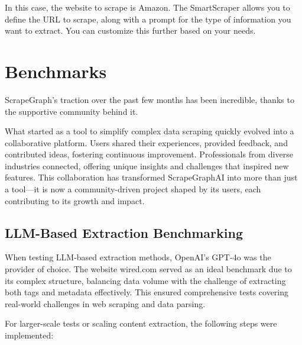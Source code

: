 In this case, the website to scrape is Amazon. The SmartScraper allows you to define the URL to scrape, along with a prompt for the type of information you want to extract. You can customize this further based on your needs.

\section{Benchmarks}

ScrapeGraph's traction over the past few months has been incredible, thanks to the supportive community behind it.

What started as a tool to simplify complex data scraping quickly evolved into a collaborative platform. Users shared their experiences, provided feedback, and contributed ideas, fostering continuous improvement. Professionals from diverse industries connected, offering unique insights and challenges that inspired new features. This collaboration has transformed ScrapeGraphAI into more than just a tool—it is now a community-driven project shaped by its users, each contributing to its growth and impact.

\subsection{LLM-Based Extraction Benchmarking}

When testing LLM-based extraction methods, OpenAI's GPT-4o was the provider of choice. The website wired.com served as an ideal benchmark due to its complex structure, balancing data volume with the challenge of extracting both tags and metadata effectively. This ensured comprehensive tests covering real-world challenges in web scraping and data parsing.

For larger-scale tests or scaling content extraction, the following steps were implemented:

